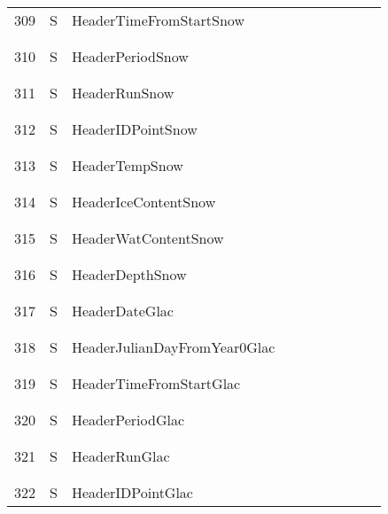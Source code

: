 \begin{longtable}{|c|c|l|c|c|c|c|p{}|c|p{}|}
309 & S & HeaderTimeFromStartSnow & & & & & & & \\
&&&&&&&&&\\\hline%
&&&&&&&&&\\
310 & S & HeaderPeriodSnow & & & & & & & \\
&&&&&&&&&\\\hline%
&&&&&&&&&\\
311 & S & HeaderRunSnow & & & & & & & \\
&&&&&&&&&\\\hline%
&&&&&&&&&\\
312 & S & HeaderIDPointSnow & & & & & & & \\
&&&&&&&&&\\\hline%
&&&&&&&&&\\
313 & S & HeaderTempSnow & & & & & & & \\
&&&&&&&&&\\\hline%
&&&&&&&&&\\
314 & S & HeaderIceContentSnow & & & & & & & \\
&&&&&&&&&\\\hline%
&&&&&&&&&\\
315 & S & HeaderWatContentSnow & & & & & & & \\
&&&&&&&&&\\\hline%
&&&&&&&&&\\
316 & S & HeaderDepthSnow & & & & & & & \\
&&&&&&&&&\\\hline%
&&&&&&&&&\\
317 & S & HeaderDateGlac & & & & & & & \\
&&&&&&&&&\\\hline%
&&&&&&&&&\\
318 & S & HeaderJulianDayFromYear0Glac & & & & & & & \\
&&&&&&&&&\\\hline%
&&&&&&&&&\\
319 & S & HeaderTimeFromStartGlac & & & & & & & \\
&&&&&&&&&\\\hline%
&&&&&&&&&\\
320 & S & HeaderPeriodGlac & & & & & & & \\
&&&&&&&&&\\\hline%
&&&&&&&&&\\
321 & S & HeaderRunGlac & & & & & & & \\
&&&&&&&&&\\\hline%
&&&&&&&&&\\
322 & S & HeaderIDPointGlac & & & & & & & \\

\end{longtable}
